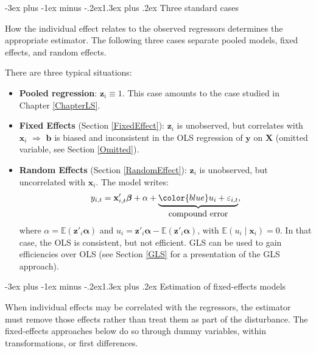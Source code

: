 \documentclass[
  11pt,
]{book}
\makeatletter
\providecommand{\tightlist}{%
  \setlength{\itemsep}{0pt}\setlength{\parskip}{0pt}}
\renewcommand\section{\@startsection{section}{1}{\z@}
  {-3ex plus -1ex minus -.2ex}{1.3ex plus .2ex}
  {\normalfont\Large\bfseries\color{TextbookInk}}}
\theoremstyle{definition}
\theoremstyle{definition}
\theoremstyle{definition}
\theoremstyle{definition}
\theoremstyle{remark}
\makeatother
\begin{document}
\section{Three standard cases}\label{panel-cases}

How the individual effect relates to the observed regressors determines the appropriate estimator. The following three cases separate pooled models, fixed effects, and random effects.

There are three typical situations:

\begin{itemize}
\tightlist
\item
  \textbf{Pooled regression}: \(\mathbf{z}_i \equiv 1\). This case amounts to the case studied in Chapter \ref{ChapterLS}.
\item
  \textbf{Fixed Effects} (Section \ref{FixedEffect}): \(\mathbf{z}_i\) is unobserved, but correlates with \(\mathbf{x}_i\) \(\Rightarrow\) \(\mathbf{b}\) is biased and inconsistent in the OLS regression of \(\mathbf{y}\) on \(\mathbf{X}\) (omitted variable, see Section \ref{Omitted}).
\item
  \textbf{Random Effects} (Section \ref{RandomEffect}): \(\mathbf{z}_i\) is unobserved, but uncorrelated with \(\mathbf{x}_i\). The model writes:
  \[
  y_{i,t} = \mathbf{x}'_{i,t}\boldsymbol\beta + \alpha +  \underbrace{{\color{blue}u_i + \varepsilon_{i,t}}}_{\mbox{compound error}},
  \]
  where \(\alpha = \mathbb{E}(\mathbf{z}'_{i}\boldsymbol\alpha)\) and \(u_i = \mathbf{z}'_{i}\boldsymbol\alpha - \mathbb{E}(\mathbf{z}'_{i}\boldsymbol\alpha)\), with \(\mathbb{E}(u_i\mid\mathbf{x}_i)=0\). In that case, the OLS is consistent, but not efficient. GLS can be used to gain efficiencies over OLS (see Section \ref{GLS} for a presentation of the GLS approach).
\end{itemize}

\section{Estimation of fixed-effects models}\label{FixedEffect}

When individual effects may be correlated with the regressors, the estimator must remove those effects rather than treat them as part of the disturbance. The fixed-effects approaches below do so through dummy variables, within transformations, or first differences.
\end{document}
